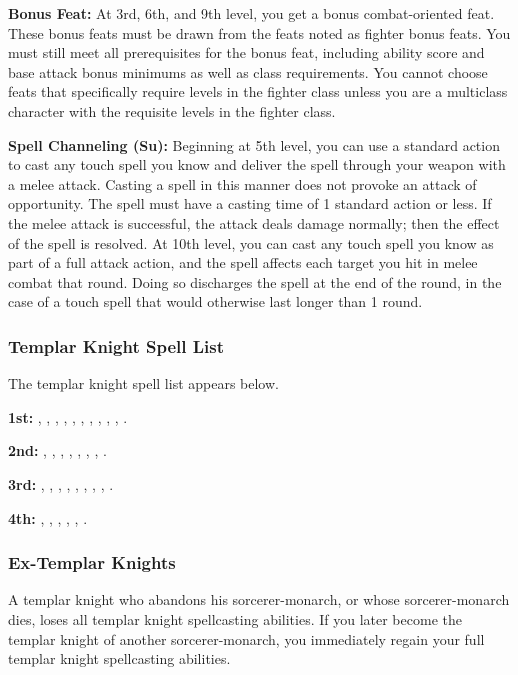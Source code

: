{\textbf{Bonus Feat:} At 3rd, 6th, and 9th level, you get a bonus combat-oriented feat. These bonus feats must be drawn from the feats noted as fighter bonus feats. You must still meet all prerequisites for the bonus feat, including ability score and base attack bonus minimums as well as class requirements. You cannot choose feats that specifically require levels in the fighter class unless you are a multiclass character with the requisite levels in the fighter class.

\textbf{Spell Channeling (Su):} Beginning at 5th level, you can use a standard action to cast any touch spell you know and deliver the spell through your weapon with a melee attack. Casting a spell in this manner does not provoke an attack of opportunity. The spell must have a casting time of 1 standard action or less. If the melee attack is successful, the attack deals damage normally; then the effect of the spell is resolved. At 10th level, you can cast any touch spell you know as part of a full attack action, and the spell affects each target you hit in melee combat that round. Doing so discharges the spell at the end of the round, in the case of a touch spell that would otherwise last longer than 1 round.

\subsubsection{Templar Knight Spell List}
The templar knight spell list appears below.

\textbf{1st:} , , , , , , , , , , .

\textbf{2nd:} , , , , , , , .

\textbf{3rd:} , , , , , , , , .

\textbf{4th:} , , , , , .

\subsubsection{Ex-Templar Knights}
A templar knight who abandons his sorcerer-monarch, or whose sorcerer-monarch dies, loses all templar knight spellcasting abilities. If you later become the templar knight of another sorcerer-monarch, you immediately regain your full templar knight spellcasting abilities.
}

